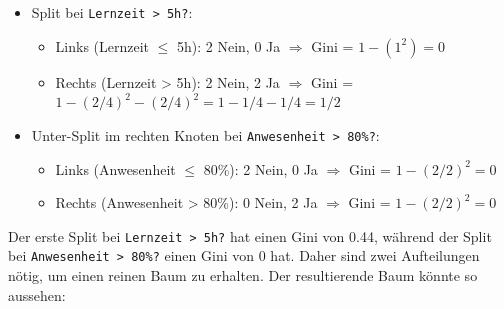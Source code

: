 \begin{myexercise}
    \begin{myanswer}
        \begin{itemize}
            \item Split bei \texttt{Lernzeit > 5h?}:
                  \begin{itemize}
                      \item Links (Lernzeit $\leq$ 5h): 2 Nein, 0 Ja $\Rightarrow$ Gini = $1 - (1^2) = 0$
                      \item Rechts (Lernzeit > 5h): 2 Nein, 2 Ja $\Rightarrow$ Gini = $1 - (2/4)^2 - (2/4)^2 = 1 - 1/4 - 1/4 = 1/2$
                  \end{itemize}
            \item Unter-Split im rechten Knoten bei \texttt{Anwesenheit > 80\%?}:
                  \begin{itemize}
                      \item Links (Anwesenheit $\leq$ 80\%): 2 Nein, 0 Ja $\Rightarrow$ Gini = $1 - (2/2)^2 = 0$
                      \item Rechts (Anwesenheit > 80\%): 0 Nein, 2 Ja $\Rightarrow$ Gini = $1 - (2/2)^2 = 0$
                  \end{itemize}
        \end{itemize}
        Der erste Split bei \texttt{Lernzeit > 5h?} hat einen Gini von 0.44, während der Split bei \texttt{Anwesenheit > 80\%?} einen Gini von 0 hat. Daher sind zwei Aufteilungen nötig, um einen reinen Baum zu erhalten. Der resultierende Baum könnte so aussehen:
        \begin{center}
        \end{center}

    \end{myanswer}
\end{myexercise}

